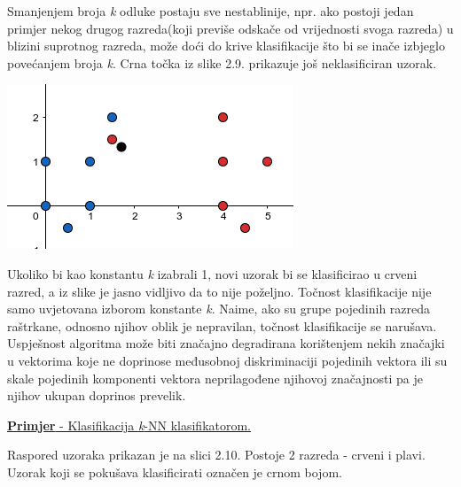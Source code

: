 \documentclass[times, utf8, zavrsni]{fer}
\begin{document}
\begin{multicols}{2}

Smanjenjem broja \textit{k} odluke postaju
sve nestablinije, npr. ako postoji jedan primjer nekog drugog 
razreda(koji previše odskače od vrijednosti svoga razreda) u blizini suprotnog razreda, 
može doći do krive klasifikacije što bi se inače izbjeglo povećanjem broja \textit{k}. 
Crna točka iz slike 2.9. prikazuje još neklasificiran uzorak. 

\begin{minipage}{\linewidth}
\vspace{10pt}
\centering
\includegraphics[width=0.8\linewidth]{img/krivo.png}
\end{minipage}

\end{multicols}

\bigbreak
Ukoliko bi kao konstantu \textit{k} izabrali 1, novi uzorak bi se klasificirao 
u crveni razred, a iz slike je jasno vidljivo da to nije poželjno. Točnost 
klasifikacije nije samo uvjetovana izborom konstante \textit{k}. Naime, 
ako su grupe pojedinih razreda raštrkane, odnosno njihov oblik je nepravilan,
točnost klasifikacije se narušava. Uspješnost algoritma može biti 
značajno degradirana korištenjem nekih značajki u vektorima koje ne 
doprinose međusobnoj diskriminaciji pojedinih vektora ili su skale pojedinih 
komponenti vektora neprilagođene njihovoj značajnosti pa je njihov ukupan doprinos prevelik. 

\bigbreak

\underline{\textbf{Primjer} - Klasifikacija \textit{k}-NN klasifikatorom.} \newline

Raspored uzoraka prikazan je na slici 2.10. Postoje 2 razreda - crveni i plavi. 
Uzorak koji se pokušava klasificirati označen je crnom bojom. 
\end{document}

